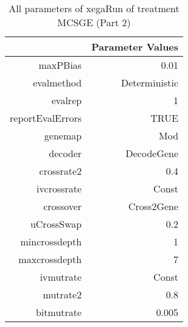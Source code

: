 \begin{table}[ht]
\centering
\begin{tabular}{rr}
  \hline
 & Parameter Values \\ 
  \hline
maxPBias & 0.01 \\ 
  evalmethod & Deterministic \\ 
  evalrep & 1 \\ 
  reportEvalErrors & TRUE \\ 
  genemap & Mod \\ 
  decoder & DecodeGene \\ 
  crossrate2 & 0.4 \\ 
  ivcrossrate & Const \\ 
  crossover & Cross2Gene \\ 
  uCrossSwap & 0.2 \\ 
  mincrossdepth & 1 \\ 
  maxcrossdepth & 7 \\ 
  ivmutrate & Const \\ 
  mutrate2 & 0.8 \\ 
  bitmutrate & 0.005 \\ 
   \hline
\end{tabular}
\caption{ All parameters of xegaRun of treatment MCSGE 
 (Part 2)} 
\end{table}
